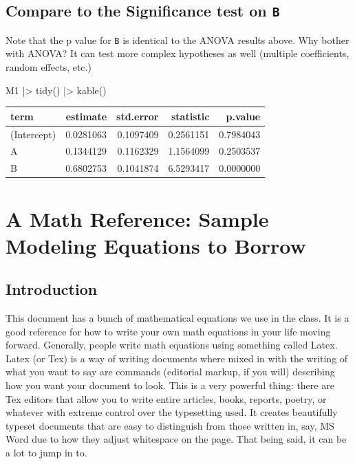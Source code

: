 \documentclass[
  letterpaper,
  DIV=11,
  numbers=noendperiod]{scrreprt}
\newenvironment{Shaded}{}{}
\newcommand{\FunctionTok}[1]{\textcolor[rgb]{0.02,0.16,0.49}{#1}}
\newcommand{\NormalTok}[1]{#1}
\newcommand{\SpecialCharTok}[1]{\textcolor[rgb]{0.25,0.44,0.63}{#1}}
\begin{document}
\section{\texorpdfstring{Compare to the Significance test on
\texttt{B}}{Compare to the Significance test on B}}\label{compare-to-the-significance-test-on-b}

Note that the p value for \texttt{B} is identical to the ANOVA results
above. Why bother with ANOVA? It can test more complex hypotheses as
well (multiple coefficients, random effects, etc.)

\begin{Shaded}
\begin{Highlighting}[]
\NormalTok{M1 }\SpecialCharTok{|\textgreater{}} 
  \FunctionTok{tidy}\NormalTok{() }\SpecialCharTok{|\textgreater{}} 
  \FunctionTok{kable}\NormalTok{()}
\end{Highlighting}
\end{Shaded}

\begin{longtable}[]{@{}lrrrr@{}}
\toprule\noalign{}
term & estimate & std.error & statistic & p.value \\
\midrule\noalign{}
\endhead
\bottomrule\noalign{}
\endlastfoot
(Intercept) & 0.0281063 & 0.1097409 & 0.2561151 & 0.7984043 \\
A & 0.1344129 & 0.1162329 & 1.1564099 & 0.2503537 \\
B & 0.6802753 & 0.1041874 & 6.5293417 & 0.0000000 \\
\end{longtable}

\chapter{A Math Reference: Sample Modeling Equations to
Borrow}\label{a-math-reference-sample-modeling-equations-to-borrow}

\section{Introduction}\label{introduction}

This document has a bunch of mathematical equations we use in the class.
It is a good reference for how to write your own math equations in your
life moving forward. Generally, people write math equations using
something called Latex. Latex (or Tex) is a way of writing documents
where mixed in with the writing of what you want to say are commands
(editorial markup, if you will) describing how you want your document to
look. This is a very powerful thing: there are Tex editors that allow
you to write entire articles, books, reports, poetry, or whatever with
extreme control over the typesetting used. It creates beautifully
typeset documents that are easy to distinguish from those written in,
say, MS Word due to how they adjust whitespace on the page. That being
said, it can be a lot to jump in to.
\end{document}
